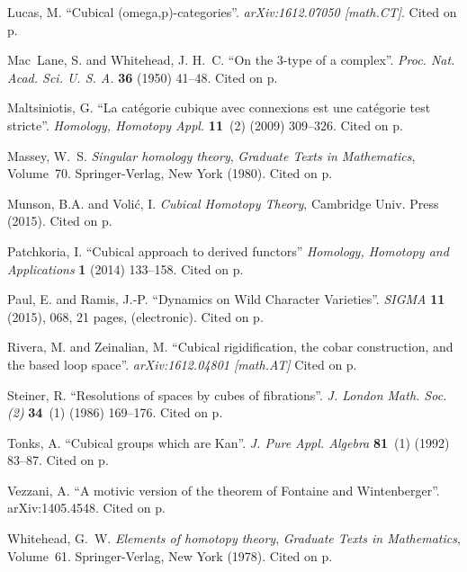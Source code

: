 \documentclass{elsarticle}
\begin{document}
\begin{thebibliography}{MLW50}
Lucas, M.
\newblock \enquote{Cubical (omega,p)-categories}.
\newblock \emph{arXiv:1612.07050 [math.CT]}. Cited on p.



Mac~Lane, S. and Whitehead, J. H.~C.
\newblock \enquote{On the {$3$}-type of a complex}.
\newblock \emph{Proc. Nat. Acad. Sci. U. S. A.} \textbf{36} (1950) 41--48.  Cited on p.

Maltsiniotis, G.
\newblock \enquote{La cat\'egorie cubique avec connexions est une cat\'egorie
  test stricte}.
\newblock \emph{Homology, Homotopy Appl.} \textbf{11}~(2) (2009) 309--326.  Cited on p.

Massey, W.~S.
\newblock \emph{Singular homology theory}, \emph{Graduate Texts in
  Mathematics}, Volume~70.
\newblock Springer-Verlag, New York (1980).  Cited on p.

Munson, B.A. and Voli\'c, I.
\newblock \emph{Cubical Homotopy Theory}, Cambridge Univ. Press (2015). Cited on p.


Patchkoria, I.
\newblock \enquote{Cubical approach to derived functors}
\newblock \emph{Homology, Homotopy and Applications} \textbf{1} (2014) 133--158.  Cited on p.

Paul, E.   and Ramis, J.-P.
\newblock \enquote{Dynamics on Wild Character Varieties}.
\newblock \emph{SIGMA} \textbf{11} (2015), 068, 21 pages, (electronic).  Cited on p.

Rivera, M. and Zeinalian, M.
\newblock \enquote{Cubical rigidification, the cobar construction, and the based loop space}.
\newblock \emph{	arXiv:1612.04801 [math.AT]} Cited on p.



Steiner, R.
\newblock \enquote{Resolutions of spaces by cubes of fibrations}.
\newblock \emph{J. London Math. Soc. (2)} \textbf{34}~(1) (1986) 169--176.  Cited on p.

Tonks, A.
\newblock \enquote{Cubical groups which are {K}an}.
\newblock \emph{J. Pure Appl. Algebra} \textbf{81}~(1) (1992) 83--87.  Cited on p.

Vezzani, A.
\newblock \enquote{A motivic version of the theorem of {F}ontaine and {W}intenberger}. arXiv:1405.4548.  Cited on p.


Whitehead, G.~W.
\newblock \emph{Elements of homotopy theory}, \emph{Graduate Texts in
  Mathematics}, Volume~61.
\newblock Springer-Verlag, New York (1978).  Cited on p.


\end{thebibliography}
\end{document}
